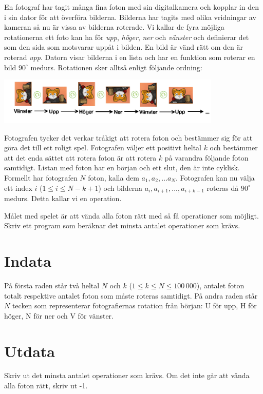 En fotograf har tagit många fina foton med sin digitalkamera och kopplar in den
i sin dator för att överföra bilderna. Bilderna har tagits med olika vridningar
av kameran så nu är vissa av bilderna roterade. Vi kallar de fyra möjliga
rotationerna ett foto kan ha för \emph{upp}, \emph{höger}, \emph{ner} och \emph{vänster} och
definierar det som den sida som motsvarar uppåt i bilden. En bild är vänd rätt
om den är roterad \emph{upp}. Datorn visar bilderna i en lista och har en funktion
som roterar en bild $90^\circ$ medurs. Rotationen sker alltså enligt följande ordning:

\includegraphics[width=0.8\textwidth]{fotografen.png}

Fotografen tycker det verkar tråkigt att rotera foton och bestämmer sig för att
göra det till ett roligt spel. Fotografen väljer ett positivt heltal $k$ och
bestämmer att det enda sättet att rotera foton är att rotera $k$ på varandra
följande foton samtidigt. Listan med foton har en början och ett slut, den är
inte cyklisk. Formellt har fotografen $N$ foton, kalla dem $a_1, a_2, \dots
a_N$. Fotografen kan nu välja ett index $i$ ($1 \leq i \leq N-k+1$)
och bilderna $a_i, a_{i+1}, ... , a_{i+k-1}$ roteras då $90^\circ$ medurs. Detta kallar vi en
operation.

Målet med spelet är att vända alla foton rätt med så få operationer som
möjligt. Skriv ett program som beräknar det minsta antalet operationer som krävs.

\section*{Indata}
På första raden står två heltal $N$ och $k$ ($1 \leq k \leq N \leq 100\,000$),
antalet foton totalt respektive antalet foton som måste roteras samtidigt.
På andra raden står $N$ tecken som representerar fotografiernas rotation från början: U för upp, H för höger, N för ner och V för vänster.

\section*{Utdata}
Skriv ut det minsta antalet operationer som krävs. Om det inte går att vända
alla foton rätt, skriv ut -1.

